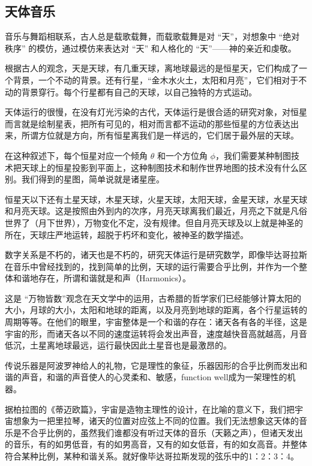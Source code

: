 \subsection{天体音乐}

音乐与舞蹈相联系，古人总是载歌载舞，而载歌载舞是对 “天”，对想象中 “绝对秩序” 的模仿，通过模仿来表达对 “天” 和人格化的 “天”——神的亲近和虔敬。

根据古人的观念，天是天球，有几重天球，离地球最远的是恒星天，它们构成了一个背景，一个不动的背景。还有行星，“金木水火土，太阳和月亮”，它们相对于不动的背景穿行。每个行星都有自己的天球，以自己独特的方式运动。

天体运行的很慢，在没有灯光污染的古代，天体运行是很合适的研究对象，对恒星而言就是绘制星表，把所有可见的，相对而言都不运动的那些恒星的方位表达出来，所谓方位就是方向，所有恒星离我们是一样远的，它们居于最外层的天球。

在这种叙述下，每个恒星对应一个倾角 $\theta $ 和一个方位角 $\phi $，我们需要某种制图技术把天球上的恒星投影到平面上，这种制图技术和制作世界地图的技术没有什么区别。我们得到的星图，简单说就是诸星座。

恒星天以下还有土星天球，木星天球，火星天球，太阳天球，金星天球，水星天球和月亮天球。这是按照由外到内的次序，月亮天球离我们最近，月亮之下就是凡俗世界了（月下世界），万物变化不定，没有规律。但自月亮天球及以上就是神圣的所在，天球庄严地运转，超脱于朽坏和变化，被神圣的数学描述。

数字关系是不朽的，诸天也是不朽的，研究天体运行是研究数学，即像毕达哥拉斯在音乐中曾经找到的，找到简单的比例，天球的运行需要合乎比例，并作为一个整体和谐地存在，所谓和谐就是和声（Harmonics）。

这是 “万物皆数”观念在天文学中的运用，古希腊的哲学家们已经能够计算太阳的大小，月球的大小，太阳和地球的距离，以及月亮到地球的距离，各个行星运转的周期等等。在他们的眼里，宇宙整体是一个和谐的存在：诸天各有各的半径，这是宇宙的形，而诸天各以不同的速度运转将会发出声音，速度越快音高就越高，月音低沉，土星离地球最远，运行最快因此土星音也是最激昂的。

传说乐器是阿波罗神给人的礼物，它是理性的象征，乐器因形的合乎比例而发出和谐的声音，和谐的声音使人的心灵柔和、敏感，function well成为一架理性的机器。

据柏拉图的《蒂迈欧篇》，宇宙是造物主理性的设计，在比喻的意义下，我们把宇宙想象为一把里拉琴，诸天的位置对应弦上不同的位置。我们无法想象这天体的音乐是不合乎比例的，虽然我们谁都没有听过天体的音乐（天籁之声），但诸天发出的音乐，有的如男低音，有的如男高音，又有的如女低音，有的如女高音。并整体符合某种比例，某种和谐关系。就好像毕达哥拉斯发现的弦乐中的1：2：3：4。

